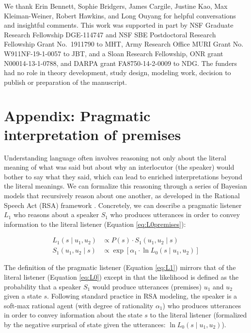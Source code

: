 \documentclass[floatsintext, man]{apa6}
\begin{document}
We thank Erin Bennett, Sophie Bridgers, James Cargile, Justine Kao, Max Kleiman-Weiner, Robert Hawkins, and Long Ouyang for helpful conversations and insightful comments. 
This work was supported in part by NSF Graduate Research Fellowship DGE-114747 and NSF SBE Postdoctoral Research Fellowship Grant No.~1911790 to MHT, Army Research
Office MURI Grant No. W911NF-19-1-0057 to JBT, and a Sloan Research Fellowship, ONR grant N00014-13-1-0788, and DARPA grant FA8750-14-2-0009 to NDG.
The funders had no role in theory development, study design, modeling work, decision to publish or preparation of the manuscript.


\newpage




\newpage 

\appendix

\section{Appendix: Pragmatic interpretation of premises}

Understanding language often involves reasoning not only about the literal meaning of what was said but about why an interlocutor (the speaker) would bother to say what they said, which can lead to enriched interpretations beyond the literal meanings. 
We can formalize this reasoning through a series of Bayesian models that recursively reason about one another, as developed in the Rational Speech Act (RSA) framework \cite{Frank2012a, goodman2016pragmatic, scontras2018probabilistic}.
Concretely, we can describe a pragmatic listener $L_1$ who reasons about a speaker $S_1$ who produces utterances in order to convey information to the literal listener (Equation \ref{eq:L0premises}):

\begin{align}
L_1(s \mid u_1,  u_2)& \propto  P(s)\cdot S_1(u_1, u_2 \mid s)  \label{eq:L1} \\ 
S_1(u_1, u_2 \mid s) &\propto  \exp [ \alpha_1 \cdot \ln L_0(s \mid u_1,  u_2)]  \label{eq:S1}
\end{align}

The definition of the pragmatic listener (Equation \ref{eq:L1}) mirrors that of the literal listener (Equation \ref{eq:L0}) except in that the likelihood is defined as the probability that a speaker $S_1$ would produce utterances (premises) $u_1$ and $u_2$ given a state $s$.
Following standard practice in RSA modeling, the speaker is a soft-max rational agent (with degree of rationality $\alpha_1$) who produces utterances in order to convey information about the state $s$ to the literal listener (formalized by the negative surprisal of state given the utterances: $\ln L_0(s \mid u_1,  u_2)$).
\end{document}
